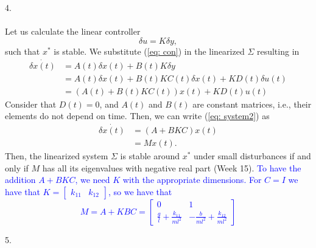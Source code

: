 4. \\ \\

Let us calculate the linear controller 
\begin{equation}
	\delta u = K\delta y, \label{eq: con}
\end{equation}
such that $x^*$ is stable. We substitute (\ref{eq: con}) in the linearized $\Sigma$ resulting in
\begin{align}
\dot {\delta x(t)} &= A(t) \delta x(t) + B(t) K\delta y \nonumber \\
	&= A(t) \delta x(t) + B(t) K C(t) \delta x(t) + K D(t) \delta u(t) \nonumber \\
	&= \left(A(t) + B(t) K C(t)\right) x(t) + K D(t) u(t) \label{eq: system2}
\end{align}
Consider that $D(t) = 0$, and $A(t)$ and $B(t)$ are constant matrices, i.e., their elements do not depend on time. Then, we can write (\ref{eq: system2}) as
\begin{align}
\dot{\delta x(t)} &= \left(A + BKC\right) x(t) \\
	&= M x(t). \label{eq: system}
\end{align}
Then, the linearized system $\Sigma$ is stable around $x^*$ under small disturbances if and only if $M$ has all its eigenvalues with negative real part (Week 15).
\textcolor{blue}{
	To have the addition $A+BKC$, we need $K$ with the appropriate dimensions. For $C = I$ we have that $K = \begin{bmatrix}k_{11} & k_{12}\end{bmatrix}$, so we have that
\begin{equation}
	M = A + KBC = \begin{bmatrix}0 & 1 \\ \frac{g}{l}+\frac{k_{11}}{ml^2} & -\frac{b}{ml^2}+\frac{k_{12}}{ml^2}\end{bmatrix} \label{eq: Mp}
\end{equation}
}


5. \\ \\

